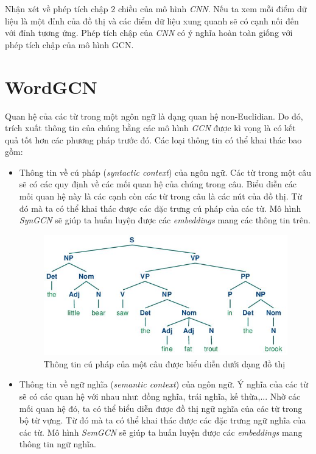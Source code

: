 Nhận xét về phép tích chập 2 chiều của mô hình \textit{CNN}. Nếu ta xem mỗi điểm dữ liệu là một đỉnh của đồ thị và các điểm dữ liệu xung quanh sẽ có cạnh nối đến với đỉnh tương ứng. Phép tích chập của \textit{CNN} có ý nghĩa hoàn toàn giống với phép tích chập của mô hình GCN.


\section{WordGCN}
Quan hệ của các từ trong một ngôn ngữ là dạng quan hệ non-Euclidian. Do đó, trích xuất thông tin của chúng bằng các mô hình \textit{GCN} được kì vọng là có kết quả tốt hơn các phương pháp trước đó. Các loại thông tin có thể khai thác bao gồm: 
\begin{itemize}
	\item Thông tin về cú pháp (\textit{syntactic context}) của ngôn ngữ. Các từ trong một câu sẽ có các quy định về các mối quan hệ của chúng trong câu. Biểu diễn các mối quan hệ này là các cạnh còn các từ trong câu là các nút của đồ thị. Từ đó mà ta có thể khai thác được các đặc trưng cú pháp của các từ. Mô hình \textit{SynGCN} sẽ giúp ta huấn luyện được các \textit{embeddings} mang các thông tin trên.

    \begin{figure}[H]
        \begin{center}
            \includegraphics[scale=0.8]{images/syntactic-context}
            \caption{Thông tin cú pháp của một câu được biểu diễn dưới dạng đồ thị}
            \label{fig:syntactic-context}
        \end{center}
    \end{figure}

	\item Thông tin về ngữ nghĩa (\textit{semantic context}) của ngôn ngữ. Ý nghĩa của các từ sẽ có các quan hệ với nhau như: đồng nghĩa, trái nghĩa, kế thừa,... Nhờ các mối quan hệ đó, ta có thể biểu diễn được đồ thị ngữ nghĩa của các từ trong bộ từ vựng. Từ đó mà ta có thể khai thác được các đặc trưng ngữ nghĩa của các từ. Mô hình \textit{SemGCN} sẽ giúp ta huấn luyện được các \textit{embeddings} mang thông tin ngữ nghĩa.


\end{itemize}
